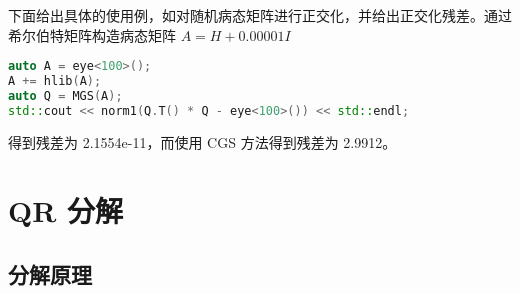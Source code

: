 下面给出具体的使用例，如对随机病态矩阵进行正交化，并给出正交化残差。通过希尔伯特矩阵构造病态矩阵 $A=H+0.00001I$
\begin{tcolorbox}
    \begin{center}
        \begin{minipage}{.92\linewidth}
            \begin{lstlisting}[language=C++]
auto A = eye<100>();
A += hlib(A);
auto Q = MGS(A);
std::cout << norm1(Q.T() * Q - eye<100>()) << std::endl;
\end{lstlisting}
        \end{minipage}
    \end{center}
\end{tcolorbox}
得到残差为 2.1554e-11，而使用 CGS 方法得到残差为 2.9912。

\section{QR 分解}
\subsection{分解原理}

